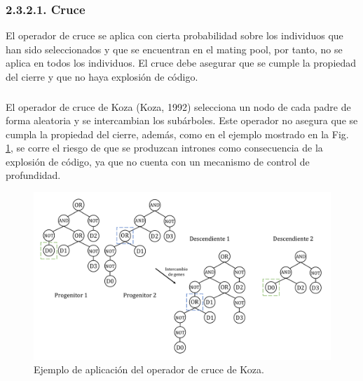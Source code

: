 \documentclass[spanish,a4paper,12pt,twoside]{report}
\begin{document}
      \subsubsection*{\normalsize 2.3.2.1. Cruce}
      El operador de cruce se aplica con cierta probabilidad sobre los individuos que han sido seleccionados y que se encuentran en el mating pool, por tanto, no se aplica en todos los individuos. El cruce debe asegurar que se cumple la propiedad del cierre y que no haya explosión de código. \par
      
        \subsubsection*{\vspace{-0.5cm}{\normalsize Operador de Koza}}
        \vspace{-0.5cm}
        El operador de cruce de Koza (Koza, 1992) selecciona un nodo de cada padre de forma aleatoria y se intercambian los subárboles. Este operador no asegura que se cumpla la propiedad del cierre, además, como en el ejemplo mostrado en la Fig. \ref{fig:3}, se corre el riesgo de que se produzcan intrones como consecuencia de la explosión de código, ya que no cuenta con un mecanismo de control de profundidad. \vfill
        \begin{figure}[H]
          \centering
          \includegraphics[width = 1\textwidth]{resources/Fig3.pdf}
          \caption{Ejemplo de aplicación del operador de cruce de Koza.}
          \label{fig:3}
        \end{figure} \par
        
\end{document}
